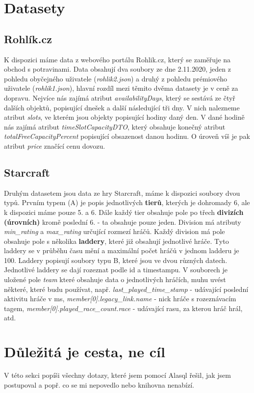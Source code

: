 \documentclass[a4, titlepage]{article}
\begin{document}
\section{Datasety}
\subsection{Rohlík.cz}
K dispozici máme data z webového portálu Rohlik.cz, který se zaměřuje na obchod s potravinami. Data obsahují dva soubory ze dne 2.11.2020, jeden z pohledu obyčejného uživatele (\textit{rohlik2.json}) a druhý z pohledu prémiového uživatele (\textit{rohlik1.json}), hlavní rozdíl mezi těmito dvěma datasety je v ceně za dopravu. Nejvíce nás zajímá atribut \textit{availabilityDays}, který se sestává ze čtyř dalších objektů, popisující dnešek a další následující tři dny. V nich nalezneme atribut \textit{slots}, ve kterém jsou objekty popisující hodiny daný den. V dané hodině nás zajímá atribut \textit{timeSlotCapacityDTO}, který obsahuje konečný atribut \textit{totalFreeCapacityPercent} popisující obsazenost danou hodinu. O úroveň víš je pak atribut \textit{price} značící cenu dovozu.

\subsection{Starcraft}
Druhým datasetem jsou data ze hry Starcraft, máme k dispozici soubory dvou typů. Prvním typem (A) je popis jednotlivých \textbf{tierů}, kterých je dohromady 6, ale k dispozici máme pouze 5. a 6. Dále každý tier obsahuje pole po třech \textbf{divizích (úrovních)} kromě poslední 6. - ta obsahuje pouze jeden. Division má atributy \textit{min\_rating} a \textit{max\_rating} určující rozmezí hráčů. Každý division má pole  obsahuje pole s několika \textbf{laddery}, které již obsahují jednotlivé hráče. Tyto laddery se v průběhu času mění a maximální počet hráčů v jednom ladderu je 100. Laddery popisují soubory typu B, které jsou ve dvou různých datech. Jednotlivé laddery se dají rozeznat podle id a timestampu. V souborech je uložené pole \textit{team} které obsahuje data o jednotlivých hráčích, muhu uvést některé, které budu používat, např. \textit{last\_played\_time\_stamp} - udávající poslední aktivitu hráče v ms, \textit{member[0].legacy\_link.name} - nick hráče s rozeznávacím tagem, \textit{member[0].played\_race\_count.race} - udávající rasu, za kterou hráč hrál, atd.

\section{Důležitá je cesta, ne cíl}
V této sekci popíši všechny dotazy, které jsem pomocí Alasql řešil, jak jsem postupoval a popř. co se mi nepovedlo nebo knihovna nenabízí. 
\end{document}
